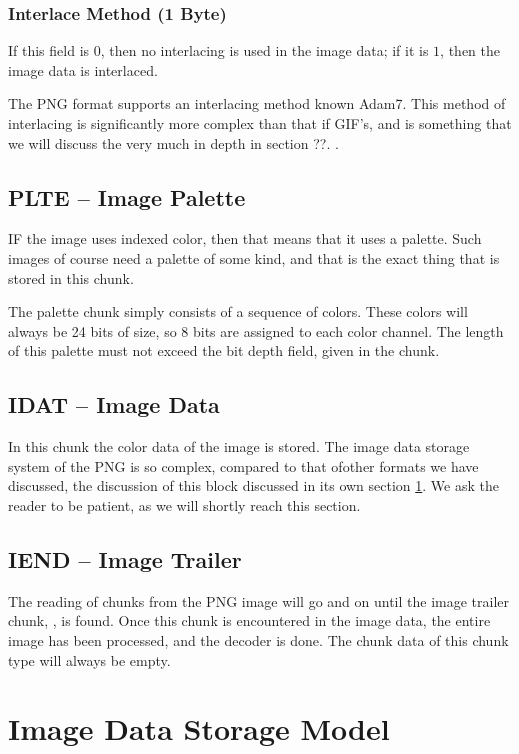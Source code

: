 \subsubsection*{Interlace Method (1 Byte)}

If this field is $0$, then no interlacing is used in the image data; if it
is $1$, then the image data is interlaced.

The PNG format supports an interlacing method known Adam7. This method
of interlacing is significantly more complex than that if GIF's, and
is something that we will discuss the very much in depth in section
??. .

\subsection{PLTE -- Image Palette}

IF the image uses indexed color, then that means that it uses a
palette. Such images of course need a palette of some kind, and that
is the exact thing that is stored in this chunk.

The palette chunk simply consists of a sequence of colors. These
colors will always be 24 bits of size, so 8 bits are assigned to each
color channel. The length of this palette must not exceed the bit
depth field, given in the  chunk.

\subsection{IDAT -- Image Data}

In this chunk the color data of the image is stored. The image data
storage system of the PNG is so complex, compared to that ofother
formats we have discussed, the discussion of this block discussed in
its own section \ref{sec:png-image-data-storage}. We ask the reader to
be patient, as we will shortly reach this section.

\subsection{IEND -- Image Trailer}

The reading of chunks from the PNG image will go and on until the
image trailer chunk, , is found. Once this chunk is
encountered in the image data, the entire image has been processed,
and the decoder is done. The chunk data of this chunk type will always
be empty.

\section{Image Data Storage Model}
\label{sec:png-image-data-storage}

